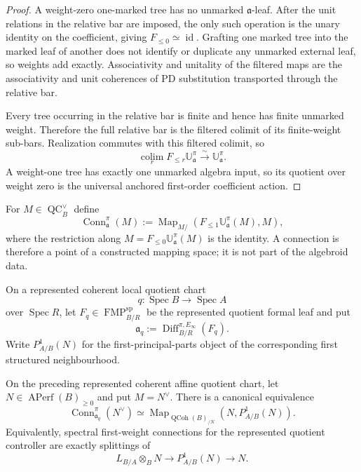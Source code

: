 \begin{proof}
A weight-zero one-marked tree has no unmarked $\mathfrak a$-leaf.  After the
unit relations in the relative bar are imposed, the only such operation is the
unary identity on the coefficient, giving
$F_{\leq0}\simeq\operatorname{id}$.  Grafting one marked tree into the marked
leaf of another does not identify or duplicate any unmarked external leaf, so
weights add exactly.  Associativity and unitality of the filtered maps are the
associativity and unit coherences of PD substitution transported through the
relative bar.

Every tree occurring in the relative bar is finite and hence has finite
unmarked weight.  Therefore the full relative bar is the filtered colimit of
its finite-weight sub-bars.  Realization commutes with this filtered colimit,
so
\[
    \operatorname*{colim}_r
    F_{\leq r}\mathbb U_{\mathfrak a}^{\pi}
    \xrightarrow{\sim}
    \mathbb U_{\mathfrak a}^{\pi}.
\]
A weight-one tree has exactly one unmarked algebra input, so its quotient over
weight zero is the universal anchored first-order coefficient action.
\end{proof}

\begin{definition}
\label{def:as-spectral-connection}
For $M\in\operatorname{QC}_B^\vee$ define
\[
\boxed{
    \operatorname{Conn}_{\mathfrak a}^{\pi}(M)
    :=
    \operatorname{Map}_{M/}
    \left(
        F_{\le1}\mathbb U_{\mathfrak a}^{\pi}(M),
        M
    \right),
}
\]
where the restriction along
$M=F_{\le0}\mathbb U_{\mathfrak a}^{\pi}(M)$ is the identity.  A connection is
therefore a point of a constructed mapping space; it is not part of the
algebroid data.
\end{definition}

On a represented coherent local quotient chart
\[
    q:\operatorname{Spec}B\longrightarrow\operatorname{Spec}A
\]
over $\operatorname{Spec}R$, let $F_q\in\operatorname{FMP}^{\mathrm{sp}}_{B/R}$
be the represented quotient formal leaf and put
\[
    \mathfrak a_q
    :=
    \operatorname{Diff}^{\pi,E_\infty}_{B/R}(F_q).
\]
Write $P^1_{A/B}(N)$ for the first-principal-parts object of the corresponding
first structured neighbourhood.

\begin{proposition}
\label{prop:as-connection-principal-parts}
On the preceding represented coherent affine quotient chart, let
$N\in\operatorname{APerf}(B)_{\ge0}$ and put $M=N^\vee$.  There is a canonical
equivalence
\[
\boxed{
    \operatorname{Conn}_{\mathfrak a_q}^{\pi}(N^\vee)
    \simeq
    \operatorname{Map}_{\operatorname{QCoh}(B)_{/N}}
    \left(N,P^1_{A/B}(N)\right).
}
\]
Equivalently, spectral first-weight connections for the represented quotient
controller are exactly splittings of
\[
    L_{B/A}\otimes_BN
    \longrightarrow
    P^1_{A/B}(N)
    \longrightarrow
    N.
\]
\end{proposition}

